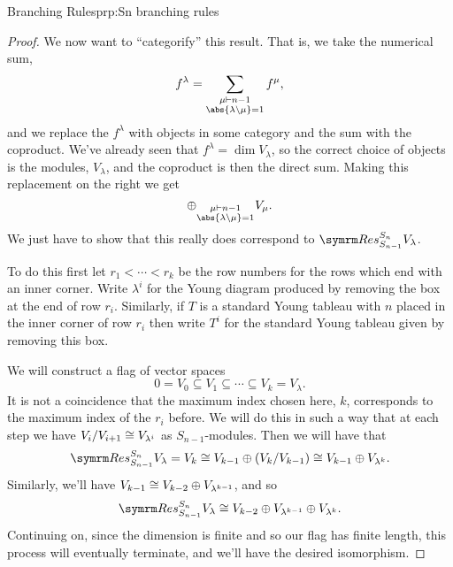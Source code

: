 \begin{prp}{Branching Rules}{prp:Sn branching rules}
\begin{proof}
        We now want to \enquote{categorify} this result.
        That is, we take the numerical sum,
        \begin{equation}
            f^\lambda = \sum_{\substack{\mu \partition n-1\\ \abs{\lambda\setminus \mu} = 1}} f^\mu,
        \end{equation}
        and we replace the \(f^\lambda\) with objects in some category and the sum with the coproduct.
        We've already seen that \(f^\lambda = \dim V_\lambda\), so the correct choice of objects is the modules, \(V_\lambda\), and the coproduct is then the direct sum.
        Making this replacement on the right we get
        \begin{equation}
            \oplus_{\substack{\mu \partition n-1\\ \abs{\lambda\setminus \mu} = 1}} V_\mu.
        \end{equation}
        We just have to show that this really does correspond to \(\Res^{S_n}_{S_{n-1}}V_\lambda\).
        
        To do this first let \(r_1 < \dotsb < r_k\) be the row numbers for the rows which end with an inner corner.
        Write \(\lambda^i\) for the Young diagram produced by removing the box at the end of row \(r_i\).
        Similarly, if \(T\) is a standard Young tableau with \(n\) placed in the inner corner of row \(r_i\) then write \(T^i\) for the standard Young tableau given by removing this box.
        
        We will construct a flag of vector spaces
        \begin{equation}
            0 = V_0 \subseteq V_1 \subseteq \dotsb \subseteq V_k = V_\lambda.
        \end{equation}
        It is not a coincidence that the maximum index chosen here, \(k\), corresponds to the maximum index of the \(r_i\) before.
        We will do this in such a way that at each step we have \(V_i/V_{i+1} \cong V_{\lambda^i}\) as \(S_{n-1}\)-modules.
        Then we will have that
        \begin{equation}
            \Res^{S_n}_{S_{n-1}} V_\lambda = V_k \isomorphic V_{k-1} \oplus (V_k/V_{k-1}) \isomorphic V_{k-1} \oplus V_{\lambda^k}.
        \end{equation}
        Similarly, we'll have \(V_{k-1} \cong V_{k-2} \oplus V_{\lambda^{k-1}}\), and so
        \begin{equation}
            \Res^{S_n}_{S_{n-1}} V_\lambda \isomorphic V_{k-2} \oplus V_{\lambda^{k-1}} \oplus V_{\lambda^k}.
        \end{equation}
        Continuing on, since the dimension is finite and so our flag has finite length, this process will eventually terminate, and we'll have the desired isomorphism.
        

\end{proof}
\end{prp}
